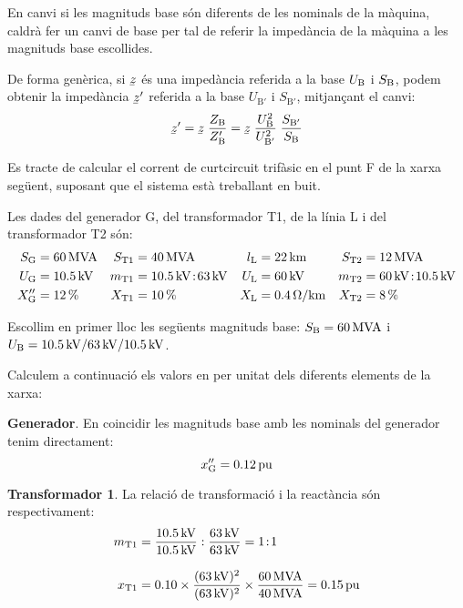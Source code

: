  En canvi si les magnituds base són diferents de les nominals de la màquina, caldrà fer un canvi de base per tal de referir la impedància de la màquina a les magnituds base escollides.

De forma genèrica, si $\cmplx{z}$ és una impedància referida a la base $U_\mathrm{B}$ i $S_\mathrm{B}$, podem obtenir la impedància $\cmplx{z}'$ referida a la base $U_{\text{B}'}$ i $S_{\text{B}'}$, mitjançant el canvi:
\begin{equation}
   \cmplx{z}' = \cmplx{z} \; \frac{Z\ped{B}}{Z\ped{B}'} = \cmplx{z} \; \frac{U\ped{B}^2}{U_{\text{B}'}^2} \; \frac{S_{\text{B}'}}{S\ped{B}}\label{eq_pu_canvi_base}
\end{equation}

\begin{exemple}\label{ex:cc-pu}
    Es tracte de calcular el corrent de curtcircuit trifàsic en el punt F de la xarxa següent, suposant
    que el sistema està treballant en buit.
    \begin{center}
        
    \end{center}

    Les dades del generador G, del transformador T1, de la línia L i del transformador T2 són:
    \begin{align*}
       S_\mathrm{G} &= \SI{60}{MVA} & S_\mathrm{T1} &= \SI{40}{MVA} & l_\mathrm{L} &= \SI{22}{km} & S_\mathrm{T2} &=
       \SI{12}{MVA} \\
       U_\mathrm{G} &= \SI{10,5}{kV} & m_\mathrm{T1} &= \SI{10,5}{kV}\!:\!\SI{63}{kV} & U_\mathrm{L} &= \SI{60}{kV} & m_\mathrm{T2} &= \SI{60}{kV}\!:\!\SI{10,5}{kV} \\
       X''_\mathrm{G} &= \SI{12}{\percent} & X_\mathrm{T1} &= \SI{10}{\percent} & X_\mathrm{L} &= \SI{0,4}{\ohm/km} & X_\mathrm{T2} &= \SI{8}{\percent}
    \end{align*}

    Escollim en primer lloc les següents magnituds base: $S_\mathrm{B} = \SI{60}{MVA}$ i $U_\mathrm{B}
    = \SI{10,5}{kV} / \SI{63}{kV} / \SI{10,5}{kV}$.

    Calculem a continuació els valors en per unitat dels diferents elements de la xarxa:

    \textbf{Generador}. En coincidir les magnituds base amb les nominals del generador tenim
     directament:
    \[
    x''_\mathrm{G} = \SI{0,12}{pu}
    \]

    \textbf{Transformador 1}. La relació de transformació i la reactància són respectivament:
    \begin{align*}
    m_\mathrm{T1} &= \frac{\SI{10,5}{kV}}{\SI{10,5}{kV}} :
    \frac{\SI{63}{kV}}{\SI{63}{kV}} = 1\!:\!1 \\[3mm]
    x_\mathrm{T1} &= \num{0,10} \times \frac{(\SI{63}{kV})^2}{(\SI{63}{kV})^2} \times
    \frac{\SI{60}{MVA}}{\SI{40}{MVA}}  = \SI{0,15}{pu}
    \end{align*}


\end{exemple}
